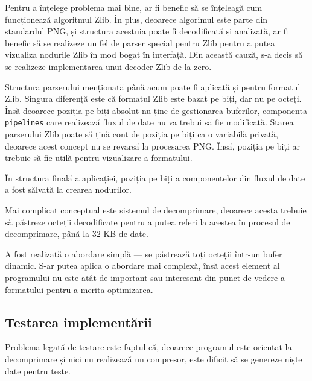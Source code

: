 \documentclass[a4paper,12pt]{report}
\begin{document}
Pentru a înțelege problema mai bine, ar fi benefic să se înțeleagă cum funcționează algoritmul Zlib.
În plus, deoarece algorimul este parte din standardul \ac{PNG},
și structura acestuia poate fi decodificată și analizată,
ar fi benefic să se realizeze un fel de parser special pentru Zlib pentru a putea vizualiza nodurile Zlib
în mod bogat în interfață.
Din această cauză, s-a decis să se realizeze implementarea unui decoder Zlib de la zero.

Structura parserului menționată până acum poate fi aplicată și pentru formatul Zlib.
Singura diferență este că formatul Zlib este bazat pe biți, dar nu pe octeți.
Însă deoarece poziția pe biți absolut nu ține de gestionarea buferilor,
componenta \texttt{pipelines} care realizează fluxul de date nu va trebui să fie modificată.
Starea parserului Zlib poate să țină cont de poziția pe biți ca o variabilă privată, deoarece
acest concept nu se revarsă la procesarea \ac{PNG}.
Însă, poziția pe biți ar trebuie să fie utilă pentru vizualizare a formatului.

În structura finală a aplicației, poziția pe biți a componentelor din fluxul de date a fost sălvată la crearea nodurilor.

Mai complicat conceptual este sistemul de decomprimare,
deoarece acesta trebuie să păstreze octeții decodificate pentru a putea referi la acestea
în procesul de decomprimare, până la 32 KB de date.

A fost realizată o abordare simplă --- se păstrează toți octeții într-un bufer dinamic.
S-ar putea aplica o abordare mai complexă, însă acest element al programului
nu este atât de important sau interesant din punct de vedere a formatului pentru a merita optimizarea.

\subsection{Testarea implementării}

Problema legată de testare este faptul că, deoarece programul este orientat
la decomprimare și nici nu realizează un compresor,
este dificit să se genereze niște date pentru teste.
\end{document}
